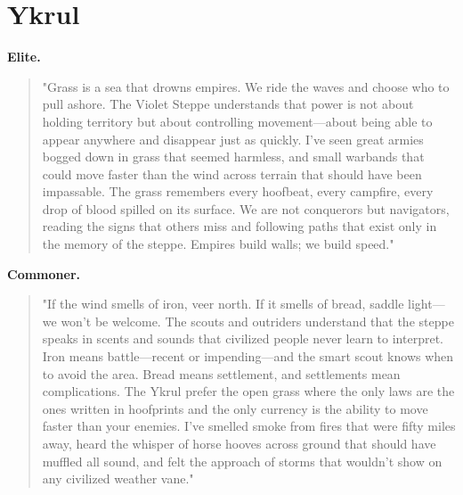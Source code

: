 \section*{Ykrul}
\textbf{Elite.}
\begin{quote}
"Grass is a sea that drowns empires. We ride the waves and choose who to pull ashore. The Violet Steppe understands that power is not about holding territory but about controlling movement—about being able to appear anywhere and disappear just as quickly. I've seen great armies bogged down in grass that seemed harmless, and small warbands that could move faster than the wind across terrain that should have been impassable. The grass remembers every hoofbeat, every campfire, every drop of blood spilled on its surface. We are not conquerors but navigators, reading the signs that others miss and following paths that exist only in the memory of the steppe. Empires build walls; we build speed."
\end{quote}
\textbf{Commoner.}
\begin{quote}
"If the wind smells of iron, veer north. If it smells of bread, saddle light—we won't be welcome. The scouts and outriders understand that the steppe speaks in scents and sounds that civilized people never learn to interpret. Iron means battle—recent or impending—and the smart scout knows when to avoid the area. Bread means settlement, and settlements mean complications. The Ykrul prefer the open grass where the only laws are the ones written in hoofprints and the only currency is the ability to move faster than your enemies. I've smelled smoke from fires that were fifty miles away, heard the whisper of horse hooves across ground that should have muffled all sound, and felt the approach of storms that wouldn't show on any civilized weather vane."
\end{quote}

